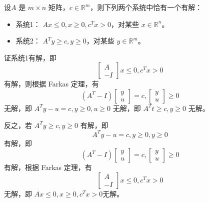 \begin{problem}
    设$A$ 是 $m\times n$ 矩阵，$c\in\mathbb{R}^m$，则下列两个系统中恰有一个有解：
    \begin{itemize}
        \item 系统1： $Ax\le 0,x\ge 0,c^Tx>0$，对某些 $x\in\mathbb{R}^n$。
        \item 系统2： $A^Ty\ge c,y\ge 0$，对某些 $y\in\mathbb{R}^m$。
    \end{itemize}
\end{problem}
\begin{solution}
    证系统1有解，即
    \[\begin{bmatrix}
        A\\
        -I
    \end{bmatrix}x\le 0, c^Tx > 0\]
    有解，则根据 Farkas 定理，有
    \[(A^T - I)\begin{bmatrix}
        y\\
        u
    \end{bmatrix} = c, \begin{bmatrix}
        y\\
        u
    \end{bmatrix}\ge 0\]
    无解，即 $A^Ty - u = c, y\ge 0, u\ge 0$ 无解，即 $A^Tt\ge c, y\ge 0$ 无解。

    反之，若 $A^Ty\ge c, y\ge 0$ 有解，即
    \[A^Ty - u = c, y\ge 0, y\ge 0\]
    有解，即
    \[(A^T - I)\begin{bmatrix}
        y\\
        u
    \end{bmatrix} = c, \begin{bmatrix}
        y\\
        u
    \end{bmatrix} \ge 0\]
    有解，根据 Farkas 定理，有
    \[\begin{bmatrix}
        A\\
        -I
    \end{bmatrix}x\le 0, c^Tx>0\]
    无解，即 $Ax\le 0, x\ge 0, c^Tx>0$无解。
\end{solution}

